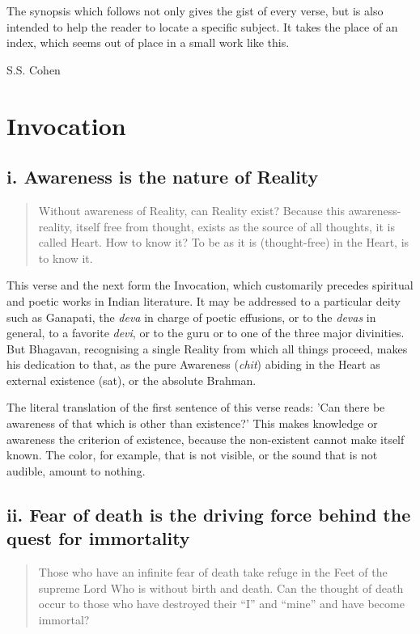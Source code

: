 \documentclass[12pt]{report}
\begin{document}
The synopsis which follows not only gives the gist of every verse, but
is also intended to help the reader to locate a specific subject. It
takes the place of an index, which seems out of place in a small work
like this.

S.S. Cohen

\chapter{Invocation}

\section{i. Awareness is the nature of Reality}

\begin{quote}
  Without awareness of Reality, can Reality exist? Because this
  awareness-reality, itself free from thought, exists as the source of
  all thoughts, it is called Heart. How to know it? To be as it is
  (thought-free) in the Heart, is to know it.
\end{quote}

This verse and the next form the Invocation, which customarily
precedes spiritual and poetic works in Indian literature. It may be
addressed to a particular deity such as Ganapati, the \emph{deva} in
charge of poetic effusions, or to the \emph{devas} in general, to a
favorite \emph{devi}, or to the guru or to one of the three major
divinities. But Bhagavan, recognising a single Reality from which all
things proceed, makes his dedication to that, as the pure Awareness
(\emph{chit}) abiding in the Heart as external existence (sat), or the
absolute Brahman.

The literal translation of the first sentence of this verse reads:
'Can there be awareness of that which is other than existence?' This
makes knowledge or awareness the criterion of existence, because the
non-existent cannot make itself known. The color, for example, that is
not visible, or the sound that is not audible, amount to nothing.

\section{ii. Fear of death is the driving force behind the quest for immortality}

\begin{quote}
  Those who have an infinite fear of death take refuge in the Feet of
  the supreme Lord Who is without birth and death. Can the thought of
  death occur to those who have destroyed their ``I'' and ``mine'' and
  have become immortal?
\end{quote}
\end{document}
